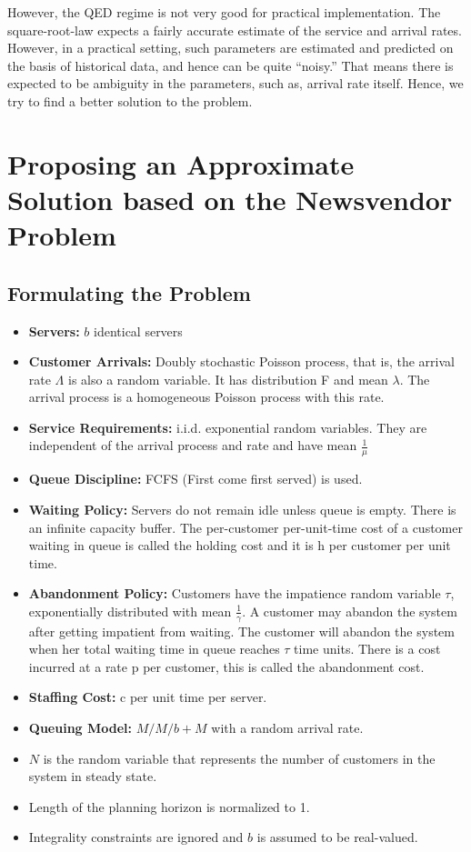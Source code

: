 However, the QED regime is not very good for practical implementation. The square-root-law expects a fairly accurate estimate of the service and arrival rates. However, in a practical setting, such parameters are estimated and predicted on the basis of historical data, and hence can be quite “noisy.” That means there is expected to be ambiguity in the parameters, such as, arrival rate itself. Hence, we try to find a better solution to the problem.

\section{Proposing an Approximate Solution based on the Newsvendor Problem}
\subsection{Formulating the Problem}
\begin{itemize}
\itemsep0em
  \item \textbf{Servers:} $b$ identical servers
  \item \textbf{Customer Arrivals:} Doubly stochastic Poisson process, that is, the arrival rate $\Lambda$ is also a random variable. It has distribution F and mean $\lambda$. The arrival process is a homogeneous Poisson process with this rate.
  \item \textbf{Service Requirements:} i.i.d. exponential random variables. They are independent of the arrival process and rate and have mean $\frac{1}{\mu}$
  \item \textbf{Queue Discipline:} FCFS (First come first served) is used. 
  \item \textbf{Waiting Policy:} Servers do not remain idle unless queue is empty. There is an infinite capacity buffer. The per-customer per-unit-time cost of a customer waiting in queue is called the holding cost and it is h per customer per unit time.  
  \item \textbf{Abandonment Policy:} Customers have the impatience random variable $\tau$, exponentially distributed with mean $\frac{1}{\gamma}$. A customer may abandon the system after getting impatient from waiting. The customer will abandon the system when her total waiting time in queue reaches $\tau$ time units. There is a cost incurred at a rate p per customer, this is called the abandonment cost. 
  \item \textbf{Staffing Cost:} c per unit time per server.
  \item \textbf{Queuing Model:} $M/M/b +M$ with a random arrival rate.
  \item $N$ is the random variable that represents the number of customers in the system in steady state. 
  \item Length of the planning horizon is normalized to 1.
  \item Integrality constraints are ignored and $b$ is assumed to be real-valued.
\end{itemize}

